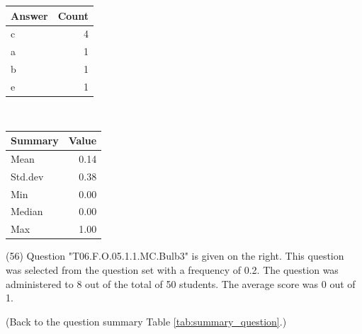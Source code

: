 \documentclass[12pt,english,nohyper]{tufte-handout}\usepackage[]{graphicx}\usepackage[]{color}
\begin{document}
\begin{center}%
\begin{tabular}{lr}
  \hline
Answer & Count \\ 
  \hline
c &   4 \\ 
  a &   1 \\ 
  b &   1 \\ 
  e &   1 \\ 
   \hline
\end{tabular}
~~~~~~~~%
\begin{tabular}{lr}
  \hline
Summary & Value \\ 
  \hline
Mean & 0.14 \\ 
  Std.dev & 0.38 \\ 
  Min & 0.00 \\ 
  Median & 0.00 \\ 
  Max & 1.00 \\ 
   \hline
\end{tabular}
\end{center}\newpage{} (56) Question "T06.F.O.05.1.1.MC.Bulb3" is given on the right. This question was selected from the question set with a frequency of 0.2. The question was administered to 8 out of the total of 50 students. The average score was 0 out of 1.

 (Back to the question summary Table \ref{tab:summary_question}.)
\end{document}
